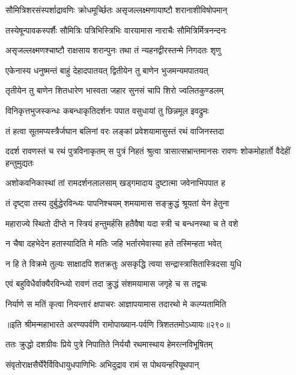 \twolineshloka
{सौमित्रिशरसंस्पर्शाद्रावणिः क्रोधमूर्च्छितः}
{असृजल्लक्ष्मणायाष्टौ शरानाशीविषोपमान्}


\twolineshloka
{तस्येषून्पावकस्पर्शैः सौमित्रिः पत्रिभिस्त्रिभिः}
{वारयामास नाराचैः सौमित्रिर्मित्रनन्दनः}


\twolineshloka
{असृजल्लक्ष्मणश्चाष्टौ राक्षसाय शरान्पुनः}
{तथा तं न्यहनद्वीरस्तन्मे निगदतः शृणु}


\twolineshloka
{एकेनास्य धनुष्मन्तं बाहुं देहादपातयत्}
{द्वितीयेन तु बाणेन भुजमन्यमपातयत्}


\twolineshloka
{तृतीयेन तु बाणेन शितधारेण भास्वता}
{जहार सुनसं चापि शिरो ज्वलितकुण्डलम्}


\twolineshloka
{विनिकृत्तभुजस्कन्धः कबन्धाकृतिदर्शनः}
{पपात वसुधायां तु छिन्नमूल इवद्रुमः}


\twolineshloka
{तं हत्वा सूतमप्यस्त्रैर्जघान बलिनां वरः}
{लङ्कां प्रवेशयामासुस्तं रथं वाजिनस्तदा}


\threelineshloka
{ददर्श रावणस्तं च रथं पुत्रविनाकृतम्}
{स पुत्रं निहतं श्रुत्वा त्रासात्सभ्रान्तमानसः}
{रावणः शोकमोहार्तो वैदेहीं हन्तुमुद्यतः}


\twolineshloka
{अशोकवनिकास्थां तां रामदर्शनलालसाम्}
{खड्गमादाय दुष्टात्मा जवेनाभिपपात ह}


\twolineshloka
{तं दृष्ट्वा तस्य दुर्बुद्धेरविन्ध्यः पापनिश्चयम्}
{शमयामास सङ्क्रुद्धं श्रूयतां येन हेतुना}


\twolineshloka
{महाराज्ये स्थितो दीप्ते न स्त्रियं हन्तुमर्हसि}
{हतैवैषा यदा स्त्री च बन्धनस्था च ते वशे}


\twolineshloka
{न चैषा दहभेदेन हतास्यादिति मे मतिः}
{जहि भर्तारमेवास्या हते तस्मिन्हता भवेत्}


\twolineshloka
{न हि ते विक्रमे तुल्यः साक्षादपि शतक्रतुः}
{असकृद्धि त्वया सन्द्रास्त्रासितास्त्रिदसा युधि}


\twolineshloka
{एवं बहुविधैर्वाक्यैरविन्ध्यो रावणं तदा}
{क्रुद्धं संशमयामास जगृहे च स तद्वचः}


\twolineshloka
{निर्याणे स मतिं कृत्वा नियन्तारं क्षपाचरः}
{आज्ञापयामास तदारथो मे कल्प्यतामिति}


॥इति श्रीमन्महाभारते अरण्यपर्वणि रामोपाख्यान-पर्वणि त्रिशततमोऽध्यायः॥२९०॥

\storymeta

\resetShloka



\twolineshloka
{ततः क्रुद्धो दशग्रीवः प्रिये पुत्रे निपातिते}
{निर्ययौ रथमास्थाय हेमरत्नविभूषितम्}


\twolineshloka
{संवृतोराक्षसैर्घेरैर्विविधायुधपाणिभिः}
{अभिदुद्राव रामं स पोथयन्हरियूथपान्}


